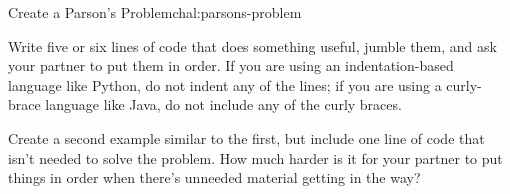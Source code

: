 \begin{challenge}{Create a Parson's Problem}{chal:parsons-problem}

\begin{genumerate}

\item
  Write five or six lines of code that does something useful, jumble
  them, and ask your partner to put them in order.  If you are using
  an indentation-based language like Python, do not indent any of the
  lines; if you are using a curly-brace language like Java, do not
  include any of the curly braces.

\item
  Create a second example similar to the first, but include one line
  of code that isn't needed to solve the problem.  How much harder is
  it for your partner to put things in order when there's unneeded
  material getting in the way?

\end{genumerate}

\end{challenge}
